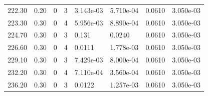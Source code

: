 \documentclass[preview]{standalone}
\begin{document}
{{{\begin{tabular}{L{1.2cm}C{1.2cm} C{0.3cm}C{0.5cm} C{1.4cm}C{1.4cm} C{1.4cm}C{1.4cm}}
  222.30  &  0.20  & 0     &  3 &  3.143e-03  & 5.710e-04  & 0.0610 &  3.050e-03   \\ 
  223.30  &  0.30  & 0     &  4 &  5.956e-03  & 8.890e-04  & 0.0610 &  3.050e-03   \\ 
  224.70  &  0.30  & 0     &  3 &  0.131  & 0.0240  & 0.0610 &  3.050e-03   \\ 
  226.60  &  0.30  & 0     &  4 &  0.0111  & 1.778e-03  & 0.0610 &  3.050e-03   \\ 
  229.10  &  0.30  & 0     &  3 &  7.429e-03  & 8.000e-04  & 0.0610 &  3.050e-03   \\ 
  232.20  &  0.30  & 0     &  4 &  7.110e-04  & 3.560e-04  & 0.0610 &  3.050e-03   \\ 
  236.20  &  0.30  & 0     &  3 &  0.0122  & 1.257e-03  & 0.0610 &  3.050e-03   \\ 
\hline 
\end{tabular} 

}}}
\end{document}
